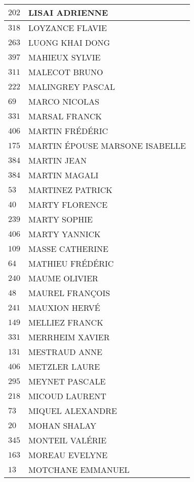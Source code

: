 \begin{xltabular}{\linewidth}{|l|X|}
    $202$ & LISAI ADRIENNE \\
    \hline
    $318$ & LOYZANCE FLAVIE \\
    \hline
    $263$ & LUONG KHAI DONG \\
    \hline
    $397$ & MAHIEUX SYLVIE \\
    \hline
    $311$ & MALECOT BRUNO \\
    \hline
    $222$ & MALINGREY PASCAL \\
    \hline
    $69$ & MARCO NICOLAS \\
    \hline
    $331$ & MARSAL FRANCK \\
    \hline
    $406$ & MARTIN FRÉDÉRIC \\
    \hline
    $175$ & MARTIN ÉPOUSE MARSONE ISABELLE \\
    \hline
    $384$ & MARTIN JEAN \\
    \hline
    $384$ & MARTIN MAGALI \\
    \hline
    $53$ & MARTINEZ PATRICK \\
    \hline
    $40$ & MARTY FLORENCE \\
    \hline
    $239$ & MARTY SOPHIE \\
    \hline
    $406$ & MARTY YANNICK \\
    \hline
    $109$ & MASSE CATHERINE \\
    \hline
    $64$ & MATHIEU FRÉDÉRIC \\
    \hline
    $240$ & MAUME OLIVIER \\
    \hline
    $48$ & MAUREL FRANÇOIS \\
    \hline
    $241$ & MAUXION HERVÉ \\
    \hline
    $149$ & MELLIEZ FRANCK \\
    \hline
    $331$ & MERRHEIM XAVIER \\
    \hline
    $131$ & MESTRAUD ANNE \\
    \hline
    $406$ & METZLER LAURE \\
    \hline
    $295$ & MEYNET PASCALE \\
    \hline
    $218$ & MICOUD LAURENT \\
    \hline
    $73$ & MIQUEL ALEXANDRE \\
    \hline
    $20$ & MOHAN SHALAY \\
    \hline
    $345$ & MONTEIL VALÉRIE \\
    \hline
    $163$ & MOREAU EVELYNE \\
    \hline
    $13$ & MOTCHANE EMMANUEL \\
    \hline

\end{xltabular}
